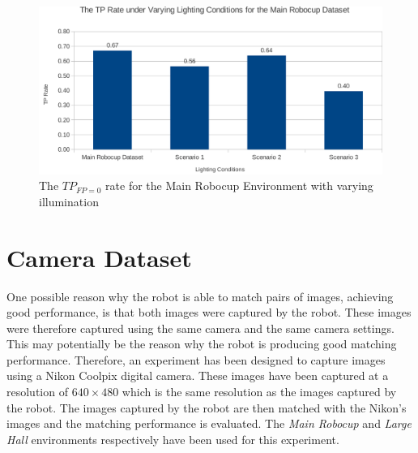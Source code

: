 \documentclass[11pt]{report}
\begin{document}
\begin{figure}[h!] 
  \centering
    \includegraphics[width=1.0\textwidth]{../Drawings/Graphs/tp_rate_lighting.pdf}
    \caption{The $TP_{FP=0}$ rate for the Main Robocup Environment with varying illumination}
    \label{fig:tp_rate_lighting}
\end{figure}






\section{Camera Dataset}
\label{sec:cameraMatching}
One possible reason why the robot is able to match pairs of images, achieving good performance, is that both images were captured by the robot. These images were therefore captured using the same camera and the same camera settings. This may potentially be the reason why the robot is producing good matching performance. Therefore, an experiment has been designed to capture images using a Nikon Coolpix digital camera. These images have been captured at a resolution of $640 \times 480$ which is the same resolution as the images captured by the robot. The images captured by the robot are then matched with the Nikon's images and the matching performance is evaluated. The \textit{Main Robocup} and \textit{Large Hall} environments respectively have been used for this experiment.\\
\end{document}
